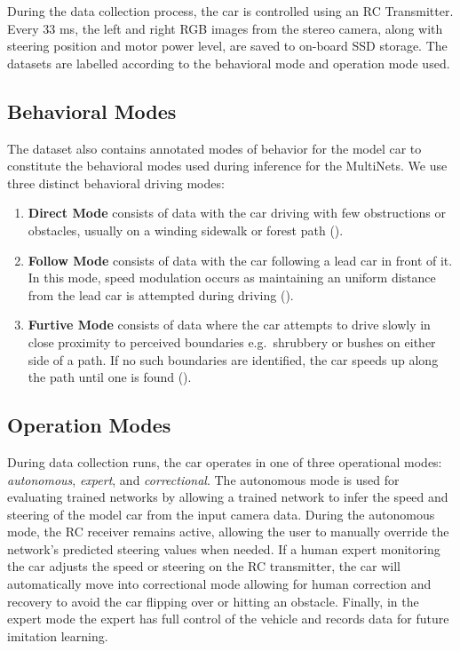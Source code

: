 During the data collection process, the car is controlled using an RC Transmitter. Every 33 ms, the left and right RGB images from the stereo camera, along with steering position and motor power level, are saved to on-board SSD storage. The datasets are labelled according to the behavioral mode and operation mode used.

\subsection{Behavioral Modes}

The dataset also contains annotated modes of behavior for the model car to constitute the behavioral modes used during inference for the MultiNets. We use three distinct behavioral driving modes:

\begin{enumerate}
    \item \textbf{Direct Mode} consists of data with the car driving with few obstructions or obstacles, usually on a winding sidewalk or forest path ().
    \item \textbf{Follow Mode} consists of data with the car following a lead car in front of it. In this mode, speed modulation occurs as maintaining an uniform distance from the lead car is attempted during driving ().
    \item \textbf{Furtive Mode} consists of data where the car attempts to drive slowly in close proximity to perceived boundaries e.g.\ shrubbery or bushes on either side of a path. If no such boundaries are identified, the car speeds up along the path until one is found ().
\end{enumerate}

%

\subsection{Operation Modes}
During data collection runs, the car operates in one of three operational modes: \textit{autonomous}, \textit{expert}, and \textit{correctional}. The autonomous mode is used for evaluating trained networks by allowing a trained network to infer the speed and steering of the model car from the input camera data. During the autonomous mode, the RC receiver remains active, allowing the user to manually override the network's predicted steering values when needed. If a human expert monitoring the car adjusts the speed or steering on the RC transmitter, the car will automatically move into correctional mode allowing for human correction and recovery to avoid the car flipping over or hitting an obstacle. Finally, in the expert mode the expert has full control of the vehicle and records data for future imitation learning.

